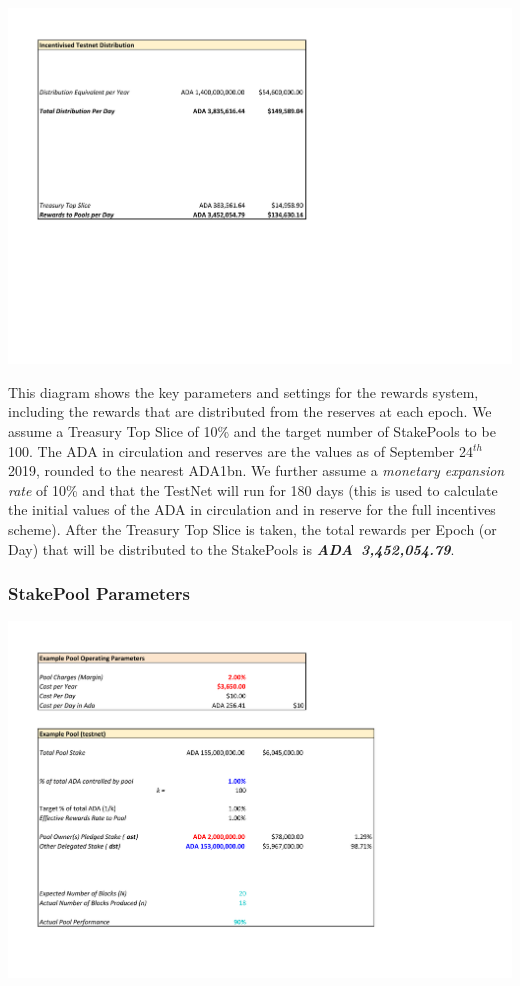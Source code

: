 \documentclass[11pt,a4paper,dvipsnames,twosided,final]{article}
\newcommand{\ada}{ADA{}}
\newcommand{\ADA}[1]{\textbf{\emph{\ada~{#1}}}}
\begin{document}
\begin{minipage}{\textwidth}
\noindent
\includegraphics[width=1.2\textwidth]{RCT2.pdf}
\vspace{-1.9in}

\noindent
This diagram shows the key parameters and settings for the rewards system, including the
rewards that are distributed from the reserves at each epoch.  We assume a Treasury Top Slice
of 10\% and the target number of StakePools to be 100.  The \ada{} in circulation and reserves
are the values as of September 24$^{th}$ 2019, rounded to the nearest ADA{1bn}.  We further
assume a \emph{monetary expansion rate} of 10\% and that the TestNet will run for 180 days
(this is used to calculate the initial values of the \ada{} in circulation and in reserve
for the full incentives scheme).  After the Treasury Top Slice is taken, the total
rewards per Epoch (or Day) that will be distributed to the StakePools is \ADA{3,452,054.79}.
\end{minipage}

\clearpage
\subsubsection*{StakePool Parameters}
\includegraphics[width=1.2\textwidth]{RCT3.pdf}
\vspace{-0.5in}
\end{document}
